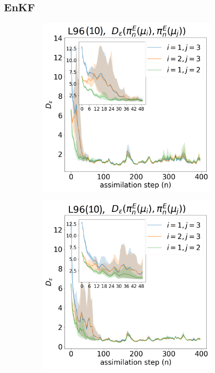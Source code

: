 \subsection{EnKF}
\begin{figure}[!t]
\centering
\begin{subfigure}{.3\textwidth}
\includegraphics[width=\columnwidth]{numerical-fs/plots/figures-EnKF-stable_50_L96_10dim.png}%
\end{subfigure}\hspace{0mm}%
\begin{subfigure}{.3\textwidth}
\includegraphics[width=\columnwidth]{numerical-fs/plots/figures-EnKF-stable_200_L96_10dim.png}%

\end{subfigure}
\end{figure}
